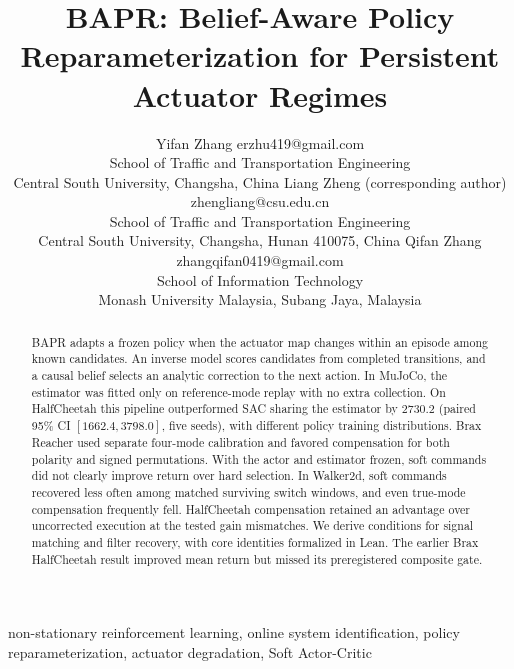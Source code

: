 \documentclass[twoside,11pt]{article}
\begin{document}
\title{BAPR: Belief-Aware Policy Reparameterization for Persistent Actuator Regimes}

\author{\name Yifan Zhang \email erzhu419@gmail.com \\
       \addr School of Traffic and Transportation Engineering\\
       Central South University, Changsha, China
       \AND
       \name Liang Zheng (corresponding author) \email zhengliang@csu.edu.cn \\
       \addr School of Traffic and Transportation Engineering\\
       Central South University, Changsha, Hunan 410075, China
       \AND
       \name Qifan Zhang \email zhangqifan0419@gmail.com \\
       \addr School of Information Technology\\
       Monash University Malaysia, Subang Jaya, Malaysia}

\maketitle

\begin{abstract}%
BAPR adapts a frozen policy when the actuator map changes within an episode among known candidates. An inverse model scores candidates from completed transitions, and a causal belief selects an analytic correction to the next action. In MuJoCo, the estimator was fitted only on reference-mode replay with no extra collection. On HalfCheetah this pipeline outperformed SAC sharing the estimator by $2730.2$ (paired 95\% CI $[1662.4,3798.0]$, five seeds), with different policy training distributions. Brax Reacher used separate four-mode calibration and favored compensation for both polarity and signed permutations. With the actor and estimator frozen, soft commands did not clearly improve return over hard selection. In Walker2d, soft commands recovered less often among matched surviving switch windows, and even true-mode compensation frequently fell. HalfCheetah compensation retained an advantage over uncorrected execution at the tested gain mismatches. We derive conditions for signal matching and filter recovery, with core identities formalized in Lean. The earlier Brax HalfCheetah result improved mean return but missed its preregistered composite gate.
\end{abstract}

\begin{keywords}
  non-stationary reinforcement learning, online system identification, policy reparameterization, actuator degradation, Soft Actor-Critic
\end{keywords}
\end{document}
